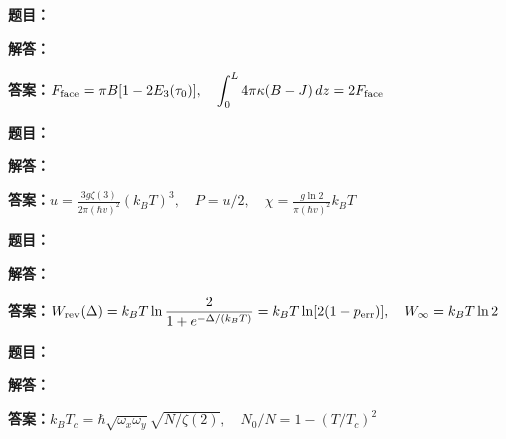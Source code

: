 \documentclass[lang=cn,color=blue,11pt]{elegantbook}
\begin{document}
\par\smallskip\noindent\hrulefill\par\medskip
{}\par
\noindent\textbf{题目：}
\par\noindent\textbf{解答：}
\par\noindent\textbf{答案：}\(\displaystyle F_{\rm face}=\pi B[1-2E_3(\tau_0)],\quad \int_0^L4\pi\kappa(B-J)\,dz=2F_{\rm face}\)\par
\par\smallskip\noindent\hrulefill\par\medskip
{}\par
\noindent\textbf{题目：}
\par\noindent\textbf{解答：}
\par\noindent\textbf{答案：}\(\displaystyle u=\frac{3g\zeta(3)}{2\pi(\hbar v)^2}(k_BT)^3,\quad P=u/2,\quad\chi=\frac{g\ln2}{\pi(\hbar v)^2}k_BT\)\par
\par\smallskip\noindent\hrulefill\par\medskip
{}\par
\noindent\textbf{题目：}
\par\noindent\textbf{解答：}
\par\noindent\textbf{答案：}\(\displaystyle W_{\rm rev}(\Delta)=k_BT\ln\frac{2}{1+e^{-\Delta/(k_BT)}}=k_BT\ln[2(1-p_{\rm err})],\quad W_{\infty}=k_BT\ln2\)\par
\par\smallskip\noindent\hrulefill\par\medskip
{}\par
\noindent\textbf{题目：}
\par\noindent\textbf{解答：}
\par\noindent\textbf{答案：}\(\displaystyle k_BT_c=\hbar\sqrt{\omega_x\omega_y}\sqrt{N/\zeta(2)},\quad N_0/N=1-(T/T_c)^2\)\par
\par\smallskip\noindent\hrulefill\par\medskip
\end{document}
